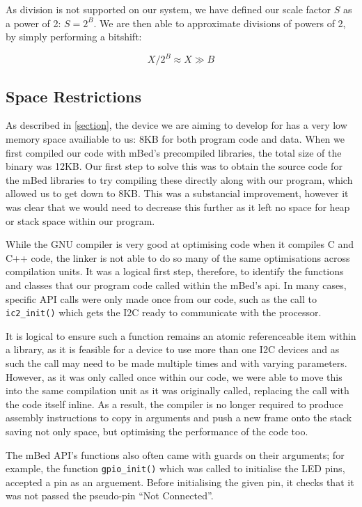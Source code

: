 As division is not supported on our system, we have defined our scale factor $S$ as a power of 2: $S=2^B$. We are then able to approximate divisions of powers of 2, by simply performing a bitshift:

\begin{equation}
\label{eq:bits:div_approx}
X/2^B\approx X \gg B
\end{equation}

\subsection{Space Restrictions}

As described in \ref{section}, the device we are aiming to develop for has a very low memory space availiable to us: 8KB for both program code and data. When we first compiled our code with mBed's precompiled libraries, the total size of the binary was 12KB. Our first step to solve this was to obtain the source code for the mBed libraries to try compiling these directly along with our program, which allowed us to get down to 8KB. This was a substancial improvement, however it was clear that we would need to decrease this further as it left no space for heap or stack space within our program.

While the GNU compiler is very good at optimising code when it compiles C and C++ code, the linker is not able to do so many of the same optimisations across compilation units. It was a logical first step, therefore, to identify the functions and classes that our program code called within the mBed's api. In many cases, specific API calls were only made once from our code, such as the call to \verb|ic2_init()| which gets the I2C ready to communicate with the processor.

It is logical to ensure such a function remains an atomic referenceable item within a library, as it is feasible for a device to use more than one I2C devices and as such the call may need to be made multiple times and with varying parameters. However, as it was only called once within our code, we were able to move this into the same compilation unit as it was originally called, replacing the call with the code itself inline. As a result, the compiler is no longer required to produce assembly instructions to copy in arguments and push a new frame onto the stack saving not only space, but optimising the performance of the code too.

The mBed API's functions also often came with guards on their arguments; for example, the function \verb|gpio_init()| which was called to initialise the LED pins, accepted a pin as an arguement. Before initialising the given pin, it checks that it was not passed the pseudo-pin ``Not Connected''.

